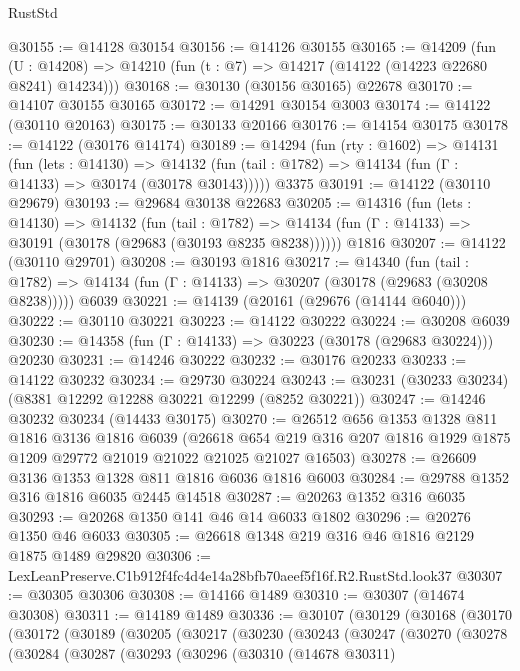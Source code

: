 \begin{lexlean}{RustStd}
\begin{coremodule}
@30155 := @14128 @30154
@30156 := @14126 @30155
@30165 := @14209
    (fun (U : @14208) => @14210 (fun (t : @7) => @14217 (@14122 (@14223 @22680 @8241) @14234)))
@30168 := @30130 (@30156 @30165) @22678
@30170 := @14107 @30155 @30165
@30172 := @14291 @30154 @3003
@30174 := @14122 (@30110 @20163)
@30175 := @30133 @20166
@30176 := @14154 @30175
@30178 := @14122 (@30176 @14174)
@30189 := @14294
    (fun (rty : @1602) =>
    @14131
      (fun (lets : @14130) =>
      @14132 (fun (tail : @1782) => @14134 (fun (Γ : @14133) => @30174 (@30178 @30143)))))
    @3375
@30191 := @14122 (@30110 @29679)
@30193 := @29684 @30138 @22683
@30205 := @14316
    (fun (lets : @14130) =>
    @14132
      (fun (tail : @1782) =>
      @14134 (fun (Γ : @14133) => @30191 (@30178 (@29683 (@30193 @8235 @8238))))))
    @1816
@30207 := @14122 (@30110 @29701)
@30208 := @30193 @1816
@30217 := @14340
    (fun (tail : @1782) => @14134 (fun (Γ : @14133) => @30207 (@30178 (@29683 (@30208 @8238)))))
    @6039
@30221 := @14139 (@20161 (@29676 (@14144 @6040)))
@30222 := @30110 @30221
@30223 := @14122 @30222
@30224 := @30208 @6039
@30230 := @14358 (fun (Γ : @14133) => @30223 (@30178 (@29683 @30224))) @20230
@30231 := @14246 @30222
@30232 := @30176 @20233
@30233 := @14122 @30232
@30234 := @29730 @30224
@30243 := @30231 (@30233 @30234) (@8381 @12292 @12288 @30221 @12299 (@8252 @30221))
@30247 := @14246 @30232 @30234 (@14433 @30175)
@30270 := @26512
    @656
    @1353
    @1328
    @811
    @1816
    @3136
    @1816
    @6039
    (@26618 @654 @219 @316 @207 @1816 @1929 @1875 @1209 @29772 @21019 @21022 @21025 @21027 @16503)
@30278 := @26609 @3136 @1353 @1328 @811 @1816 @6036 @1816 @6003
@30284 := @29788 @1352 @316 @1816 @6035 @2445 @14518
@30287 := @20263 @1352 @316 @6035
@30293 := @20268 @1350 @141 @46 @14 @6033 @1802
@30296 := @20276 @1350 @46 @6033
@30305 := @26618 @1348 @219 @316 @46 @1816 @2129 @1875 @1489 @29820
@30306 := LexLeanPreserve.C1b912f4fc4d4e14a28bfb70aeef5f16f.R2.RustStd.look37
@30307 := @30305 @30306
@30308 := @14166 @1489
@30310 := @30307 (@14674 @30308)
@30311 := @14189 @1489
@30336 := @30107
    (@30129
      (@30168
        (@30170
          (@30172
            (@30189
              (@30205
                (@30217
                  (@30230
                    (@30243
                      (@30247
                        (@30270
                          (@30278
                            (@30284
                              (@30287
                                (@30293
                                  (@30296
                                    (@30310
                                      (@14678 @30311)

\end{coremodule}
\end{lexlean}
